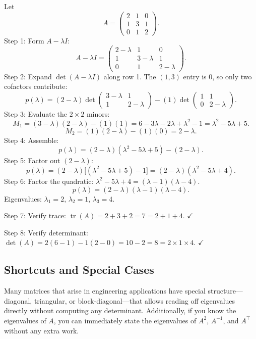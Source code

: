 \documentclass[12pt,a4paper]{article}
\begin{document}
Let
\[
  A = \begin{pmatrix} 2 & 1 & 0 \\ 1 & 3 & 1 \\ 0 & 1 & 2 \end{pmatrix}.
\]
Step 1: Form $A - \lambda I$:
\[
  A - \lambda I = \begin{pmatrix} 2-\lambda & 1 & 0 \\ 1 & 3-\lambda & 1 \\ 0 & 1 & 2-\lambda \end{pmatrix}.
\]
Step 2: Expand $\det(A-\lambda I)$ along row 1. The $(1,3)$ entry is $0$, so only two cofactors contribute:
\[
  p(\lambda) = (2-\lambda)\det\begin{pmatrix} 3-\lambda & 1 \\ 1 & 2-\lambda \end{pmatrix}
             - (1)\det\begin{pmatrix} 1 & 1 \\ 0 & 2-\lambda \end{pmatrix}.
\]
Step 3: Evaluate the $2\times 2$ minors:
\[
  M_1 = (3-\lambda)(2-\lambda) - (1)(1) = 6 - 3\lambda - 2\lambda + \lambda^2 - 1 = \lambda^2 - 5\lambda + 5.
\]
\[
  M_2 = (1)(2-\lambda) - (1)(0) = 2 - \lambda.
\]
Step 4: Assemble:
\[
  p(\lambda) = (2-\lambda)(\lambda^2 - 5\lambda + 5) - (2-\lambda).
\]
Step 5: Factor out $(2-\lambda)$:
\[
  p(\lambda) = (2-\lambda)\bigl[(\lambda^2 - 5\lambda + 5) - 1\bigr] = (2-\lambda)(\lambda^2 - 5\lambda + 4).
\]
Step 6: Factor the quadratic: $\lambda^2 - 5\lambda + 4 = (\lambda-1)(\lambda-4)$.
\[
  p(\lambda) = (2-\lambda)(\lambda-1)(\lambda-4).
\]
Eigenvalues: $\lambda_1 = 2$, $\lambda_2 = 1$, $\lambda_3 = 4$.

Step 7: Verify trace: $\operatorname{tr}(A)=2+3+2=7=2+1+4$. $\checkmark$

Step 8: Verify determinant:
$\det(A) = 2(6-1) - 1(2-0) = 10 - 2 = 8 = 2\times1\times4$. $\checkmark$

\subsection{Shortcuts and Special Cases}

Many matrices that arise in engineering applications have special structure---diagonal,
triangular, or block-diagonal---that allows reading off eigenvalues directly without
computing any determinant. Additionally, if you know the eigenvalues of $A$, you can
immediately state the eigenvalues of $A^2$, $A^{-1}$, and $A^\top$ without any extra work.
\end{document}
